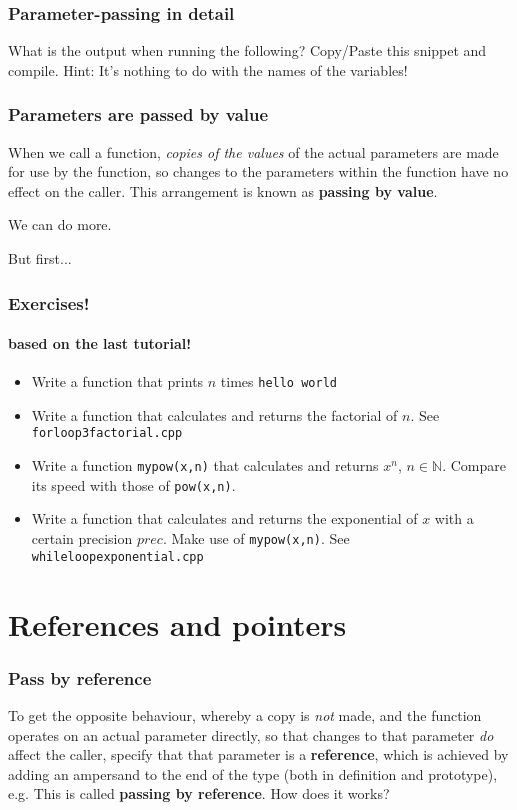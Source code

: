 \documentclass[12pt]{beamer}
\begin{document}
\begin{frame}
	\frametitle{Parameter-passing in detail}
	What is the output when running the following?
	\LstParamPass
    Copy/Paste this snippet and compile. Hint: It's nothing to do with the names of the variables!
\end{frame}


\begin{frame}
	\frametitle{Parameters are passed by value}
	When we call a function, \emph{copies of the values} of the actual
	parameters are made for use by the function, so changes to the
	parameters within the function have no effect on the caller. This
	arrangement is known as \textbf{passing by value}.

    We can do more.

    But first...
    
\end{frame}


\begin{frame}
	\frametitle{Exercises!}
	\framesubtitle{based on the last tutorial!}
    \begin{itemize}
        \item Write a function that prints $n$ times \lstinline/hello world/
        \item Write a function that calculates and returns the factorial of $n$. See \lstinline/forloop3factorial.cpp/
        \item Write a function \lstinline/mypow(x,n)/ that calculates and returns $x^n$, $n \in \mathbb{N}$. Compare its speed with those of \lstinline/pow(x,n)/.
        \item Write a function that calculates and returns the exponential of $x$ with a certain precision $prec$. Make use of \lstinline/mypow(x,n)/.
             See \lstinline/whileloopexponential.cpp/
    \end{itemize}
\end{frame}


\section{References and pointers}

\begin{frame}
\frametitle{Pass by reference}
	To get the opposite behaviour, whereby a copy is \emph{not} made, and
	the function operates on an actual parameter directly, so that changes
	to that parameter \emph{do} affect the caller, specify that that
	parameter is a \textbf{reference}, which is achieved by adding an
	ampersand to the end of the type (both in definition and prototype), e.g.
	\LstRef
	This is called \textbf{passing by reference}.
    How does it works?
\end{frame}
\end{document}
